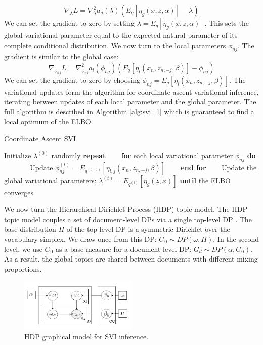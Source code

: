 \begin{equation}
   \nabla_{\lambda}L = \nabla_{\lambda}^{2}a_g(\lambda)(E_q[\eta_g(x,z,\alpha)] - \lambda) 
\end{equation}
We can set the gradient to zero by setting $\lambda = E_q[\eta_g(x,z,\alpha)]$. This sets the global variational parameter equal to the expected natural parameter of its complete conditional distribution. We now turn to the local parameters $\phi_{nj}$. The gradient is similar to the global case:
\begin{equation}
   \nabla_{\phi_{nj}}L = \nabla_{\phi_{nj}}^{2}a_{l}(\phi_{nj})(E_q[\eta_l(x_n,z_{n,-j},\beta)] - \phi_{nj})
\end{equation}
We can set the gradient to zero by choosing $\phi_{nj} = E_q[\eta_l(x_n,z_{n,-j},\beta)]$. The variational updates form the algorithm for coordinate ascent variational inference, iterating between updates of each local parameter and the global parameter. The full algorithm is described in Algorithm \ref{alg:svi_1} which is guaranteed to find a local optimum of the ELBO.\\

\begin{algorithm}
\caption{Coordinate Ascent SVI \cite{SVI2013}}
\label{alg:svi_1}
\begin{algorithmic}[1]
\STATE Initialize $\lambda^{(0)}$ randomly
\STATE \textbf{repeat}
\STATE ~~~ \textbf{for} each local variational parameter $\phi_{nj}$ \textbf{do}
\STATE ~~~ ~~~ Update $\phi_{nj}^{(t)} = E_{q^{(t-1)}}[\eta_{l,j}(x_n,z_{n,-j},\beta)]$
\STATE ~~~ \textbf{end for}
\STATE ~~~ Update the global variational parameters: $\lambda^{(t)} = E_{q^{(t)}}[\eta_g(z,x)]$
\STATE \textbf{until} the ELBO converges
\end{algorithmic}
\end{algorithm}

We now turn the Hierarchical Dirichlet Process (HDP) topic model. The HDP topic model couples a set of document-level DPs via a single top-level DP \cite{teh2005jasa}. The base distribution $H$ of the top-level DP is a symmetric Dirichlet over the vocabulary simplex. We draw once from this DP: $G_0 \sim DP(\omega, H)$. In the second level, we use $G_0$ as a base measure for a document level DP: $G_d \sim DP(\alpha, G_0)$. As a result, the global topics are shared between documents with different mixing proportions.

\begin{figure}[tbhp]
    \centering
    \includegraphics[width=0.5\textwidth, trim={10 10 10 10}]{figures/hdp_svi_gm.png}
    \caption{HDP graphical model for SVI inference.}
    \label{fig:svi_gm2}
\end{figure}


